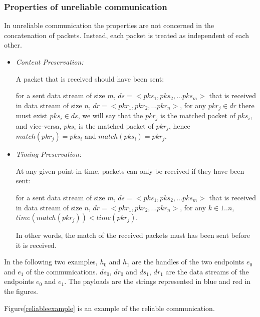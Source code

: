 \subsubsection{Properties of unreliable communication}\label{unreliablepro}
In unreliable communication the properties are not concerned in the concatenation of packets. Instead, each packet is treated as independent of each other.
\begin{itemize}
 \item \textit{ Content Preservation:} 

A packet that is received should have been sent:

for a sent data stream of size $m$, $ds= <pks_1, pks_2, ... pks_m>$ that is received in data stream of size $n$, $dr = <pkr_1, pkr_2, ... pkr_n>$,  for any $pkr_j \in dr$ there must exist $pks_i \in ds$, we will say that the $pkr_j$ is the matched packet of $pks_i$, and vice-versa, $pks_i$ is the matched packet of $pkr_j$, hence $match(pkr_j) = pks_i$  and $match(pks_i) = pkr_j$.

 \item \textit{Timing Preservation:}  
 
At any given point in time, packets can only be received if they have been sent:

for a sent data stream of size $m$, $ds= <pks_1, pks_2, ... pks_m>$ that is received in data stream of size $n$, $dr = <pkr_1, pkr_2, ... pkr_n>$, for any $k \in {1..n}$, $time(match(pkr_j)) < time(pkr_j)$.

In other words, the match of the received packets must has been sent before it is received.
\end{itemize}


In the following two examples, $h_0$ and $h_1$ are the handles of the two endpoints $e_0$ and $e_1$ of the communications. $ds_0$, $dr_0$ and $ds_1$, $dr_1$ are the data streams of the endpoints $e_0$ and $e_1$. The payloads are the strings represented in blue and red in the figures. 

Figure\ref{reliableexample} is an example of the reliable communication. 

